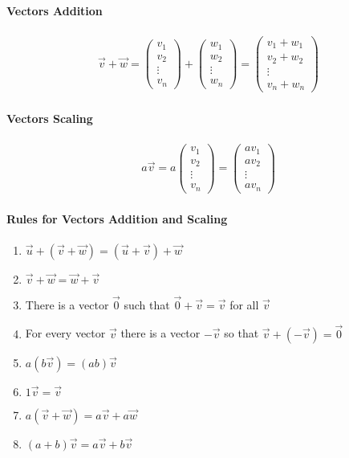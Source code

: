 \paragraph{Vectors Addition}

\begin{align*}
	\vec{v}+\vec{w}=\begin{pmatrix}
	v_1 \\ v_2 \\ \vdots \\ v_n
	\end{pmatrix}+\begin{pmatrix}
	w_1 \\ w_2 \\ \vdots \\ w_n
	\end{pmatrix}=\begin{pmatrix}
	v_1+w_1 \\ v_2+w_2 \\ \vdots \\ v_n+w_n
	\end{pmatrix}
\end{align*}

\paragraph{Vectors Scaling}

\begin{align*}
	a\vec{v}=a\begin{pmatrix}
	v_1 \\ v_2 \\ \vdots \\ v_n
	\end{pmatrix}=\begin{pmatrix}
	av_1 \\ av_2 \\ \vdots \\ av_n
	\end{pmatrix}
\end{align*}

\paragraph{Rules for Vectors Addition and Scaling}

\begin{enumerate}
	\item $\vec{u}+\left(\vec{v}+\vec{w}\right)=\left(\vec{u}+\vec{v}\right)+\vec{w}$
	\item $\vec{v}+\vec{w}=\vec{w}+\vec{v}$
	\item There is a vector $\vec{0}$ such that $\vec{0}+\vec{v}=\vec{v}$ for all $\vec{v}$
	\item For every vector $\vec{v}$ there is a vector $-\vec{v}$ so that $\vec{v}+\left(-\vec{v}\right)=\vec{0}$
	\item $a\left(b\vec{v}\right)=\left(ab\right)\vec{v}$
	\item $1\vec{v}=\vec{v}$
	\item $a\left(\vec{v}+\vec{w}\right)=a\vec{v}+a\vec{w}$
	\item $\left(a+b\right)\vec{v}=a\vec{v}+b\vec{v}$
\end{enumerate}

